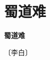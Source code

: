 \documentclass[12pt,UTF-8,openany,fontset=none]{ctexbook}
\begin{document}
\vspace{8pt}
\clearpage

\section{蜀道难}


\begin{center}
    {\bfseries 蜀道难}

    \vspace{18pt}

    \begin{large}\xuwen
        〔李白〕
    \end{large}

\end{center}

    \vspace{18pt}  %
\end{document}
